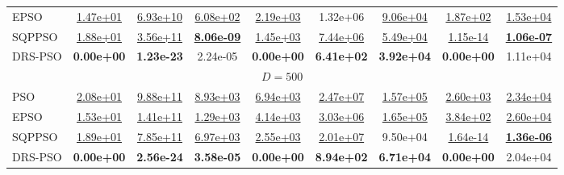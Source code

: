 \begin{table}
\begin{tabular}{lcccccccc}
EPSO & {\underline{1.47e+01}} & {\underline{6.93e+10}} & {\underline{6.08e+02}} & {\underline{2.19e+03}} & {1.32e+06} & {\underline{9.06e+04}} & {\underline{1.87e+02}} & {\underline{1.53e+04}} \\
SQPPSO & {\underline{1.88e+01}} & {\underline{3.56e+11}} & \textbf{\underline{8.06e-09}} & {\underline{1.45e+03}} & {\underline{7.44e+06}} & {\underline{5.49e+04}} & {\underline{1.15e-14}} & \textbf{\underline{1.06e-07}} \\
DRS-PSO & \textbf{0.00e+00} & \textbf{1.23e-23} & {2.24e-05} & \textbf{0.00e+00} & \textbf{6.41e+02} & \textbf{3.92e+04} & \textbf{0.00e+00} & {1.11e+04} \\
\midrule\multicolumn{9}{c}{ $D = 500$ }\\ \midrule
PSO & {\underline{2.08e+01}} & {\underline{9.88e+11}} & {\underline{8.93e+03}} & {\underline{6.94e+03}} & {\underline{2.47e+07}} & {\underline{1.57e+05}} & {\underline{2.60e+03}} & {\underline{2.34e+04}} \\
EPSO & {\underline{1.53e+01}} & {\underline{1.41e+11}} & {\underline{1.29e+03}} & {\underline{4.14e+03}} & {\underline{3.03e+06}} & {\underline{1.65e+05}} & {\underline{3.84e+02}} & {\underline{2.60e+04}} \\
SQPPSO & {\underline{1.89e+01}} & {\underline{7.85e+11}} & {\underline{6.97e+03}} & {\underline{2.55e+03}} & {\underline{2.01e+07}} & {9.50e+04} & {\underline{1.64e-14}} & \textbf{\underline{1.36e-06}} \\
DRS-PSO & \textbf{0.00e+00} & \textbf{2.56e-24} & \textbf{3.58e-05} & \textbf{0.00e+00} & \textbf{8.94e+02} & \textbf{6.71e+04} & \textbf{0.00e+00} & {2.04e+04} \\
\bottomrule
\end{tabular}
\end{table}